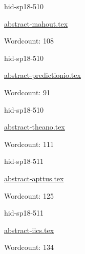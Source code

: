 

\begin{IU}

hid-sp18-510

\href{https://github.com/cloudmesh-community/hid-sp18-510/blob/master//technology/abstract-mahout.tex}{abstract-mahout.tex}

 

Wordcount: 108

\end{IU}



\begin{IU}

hid-sp18-510

\href{https://github.com/cloudmesh-community/hid-sp18-510/blob/master//technology/abstract-predictionio.tex}{abstract-predictionio.tex}

 

Wordcount: 91

\end{IU}



\begin{IU}

hid-sp18-510

\href{https://github.com/cloudmesh-community/hid-sp18-510/blob/master//technology/abstract-theano.tex}{abstract-theano.tex}

 

Wordcount: 111

\end{IU}



\begin{IU}

hid-sp18-511

\href{https://github.com/cloudmesh-community/hid-sp18-511/blob/master//technology/abstract-apttus.tex}{abstract-apttus.tex}

 

Wordcount: 125

\end{IU}



\begin{IU}

hid-sp18-511

\href{https://github.com/cloudmesh-community/hid-sp18-511/blob/master//technology/abstract-iics.tex}{abstract-iics.tex}

 

Wordcount: 134

\end{IU}

